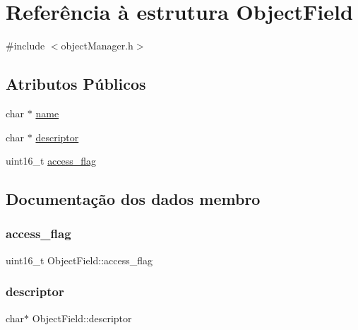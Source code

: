\hypertarget{struct_object_field}{}\section{Referência à estrutura Object\+Field}
\label{struct_object_field}


{\ttfamily \#include $<$object\+Manager.\+h$>$}

\subsection*{Atributos Públicos}
\begin{DoxyCompactItemize}
\item 
char $\ast$ \hyperlink{struct_object_field_abcb295af73c70e33c15fac95467628c0}{name}
\item 
char $\ast$ \hyperlink{struct_object_field_adb9e99ac783f703bb10c49e311a05b85}{descriptor}
\item 
uint16\+\_\+t \hyperlink{struct_object_field_a300a013e6d0c194e17f3e9ea97222636}{access\+\_\+flag}
\end{DoxyCompactItemize}


\subsection{Documentação dos dados membro}
\hypertarget{struct_object_field_a300a013e6d0c194e17f3e9ea97222636}{}\label{struct_object_field_a300a013e6d0c194e17f3e9ea97222636} 
\subsubsection{\texorpdfstring{access\+\_\+flag}{access\_flag}}
{\footnotesize\ttfamily uint16\+\_\+t Object\+Field\+::access\+\_\+flag}

\hypertarget{struct_object_field_adb9e99ac783f703bb10c49e311a05b85}{}\label{struct_object_field_adb9e99ac783f703bb10c49e311a05b85} 
\subsubsection{\texorpdfstring{descriptor}{descriptor}}
{\footnotesize\ttfamily char$\ast$ Object\+Field\+::descriptor}

